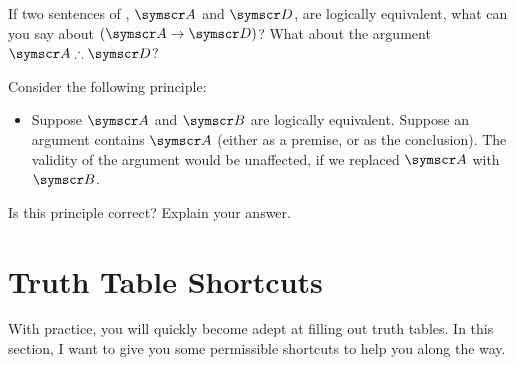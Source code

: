 \problempart 
If two sentences of \TFL, $\meta{A}$ and $\meta{D}$, are logically equivalent, what can you say about $(\meta{A}\eif \meta{D})$? What about the argument $\meta{A}\ttherefore \meta{D}$?

\problempart 
Consider the following principle:
	\begin{itemize}
		\item Suppose $\meta{A}$ and $\meta{B}$ are logically equivalent. Suppose an argument contains $\meta{A}$ (either as a premise, or as the conclusion). The validity of the argument would be unaffected, if we replaced $\meta{A}$ with $\meta{B}$.
	\end{itemize}
Is this principle correct? Explain your answer.



\chapter{Truth Table Shortcuts}\label{s:shortcuts}
With practice, you will quickly become adept at filling out truth tables. In this section, I want to give you some permissible shortcuts to help you along the way. 

